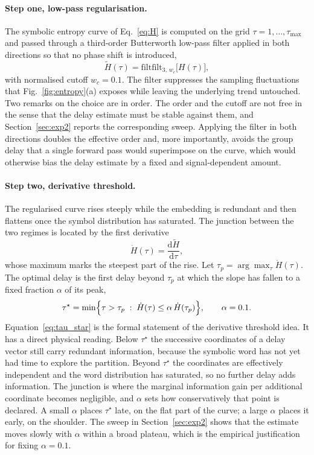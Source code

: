 \documentclass[10pt,a4paper,twocolumn]{article}
\begin{document}
\paragraph{Step one, low-pass regularisation.}
The symbolic entropy curve of Eq.~\eqref{eq:H} is computed on the grid
$\tau=1,\dots,\tau_{\max}$ and passed through a third-order Butterworth
low-pass filter applied in both directions so that no phase shift is
introduced,
\begin{equation}
\widetilde{H}(\tau) = \mathrm{filtfilt}_{3,\,w_c}
\bigl[H(\tau)\bigr] ,
\label{eq:filt}
\end{equation}
with normalised cutoff $w_c = 0.1$.  The filter suppresses the sampling
fluctuations that Fig.~\ref{fig:entropy}(a) exposes while leaving the
underlying trend untouched.  Two remarks on the choice are in order.  The
order and the cutoff are not free in the sense that the delay estimate must
be stable against them, and Section~\ref{sec:exp2} reports the corresponding
sweep.  Applying the filter in both directions doubles the effective order
and, more importantly, avoids the group delay that a single forward pass
would superimpose on the curve, which would otherwise bias the delay
estimate by a fixed and signal-dependent amount.

\paragraph{Step two, derivative threshold.}
The regularised curve rises steeply while the embedding is redundant and then
flattens once the symbol distribution has saturated.  The junction between
the two regimes is located by the first derivative
\begin{equation}
\dot{H}(\tau) = \frac{\mathrm{d}\widetilde{H}}{\mathrm{d}\tau} ,
\label{eq:d1}
\end{equation}
whose maximum marks the steepest part of the rise.  Let
$\tau_p = \arg\max_{\tau} \dot{H}(\tau)$.  The optimal delay is the first
delay beyond $\tau_p$ at which the slope has fallen to a fixed fraction
$\alpha$ of its peak,
\begin{equation}
\tau^{\star} = \min\Bigl\{\tau > \tau_p \; : \;
\dot{H}(\tau) \le \alpha \, \dot{H}(\tau_p)\Bigr\} , \qquad \alpha = 0.1 .
\label{eq:tau_star}
\end{equation}
Equation~\eqref{eq:tau_star} is the formal statement of the derivative
threshold idea.  It has a direct physical reading.  Below $\tau^{\star}$ the
successive coordinates of a delay vector still carry redundant information,
because the symbolic word has not yet had time to explore the partition.
Beyond $\tau^{\star}$ the coordinates are effectively independent and the
word distribution has saturated, so no further delay adds information.  The
junction is where the marginal information gain per additional coordinate
becomes negligible, and $\alpha$ sets how conservatively that point is
declared.  A small $\alpha$ places $\tau^{\star}$ late, on the flat part of
the curve; a large $\alpha$ places it early, on the shoulder.  The sweep in
Section~\ref{sec:exp2} shows that the estimate moves slowly with $\alpha$
within a broad plateau, which is the empirical justification for fixing
$\alpha = 0.1$.
\end{document}
